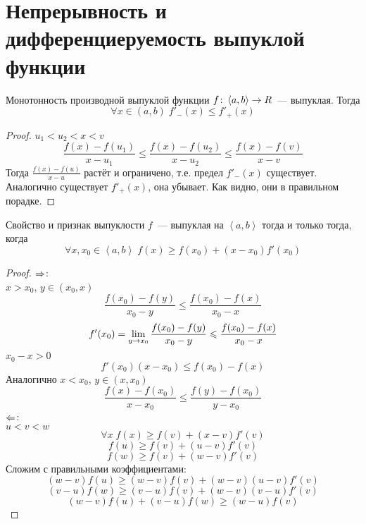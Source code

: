 ﻿\section{Непрерывность и дифференциеруемость выпуклой функции}

\begin{theorem}{Монотонность производной выпуклой функции}
$f\colon \left<a, b\right> \rightarrow R$~--- выпуклая. Тогда 
$$\forall x \in (a, b)\; f'_-(x) \leqslant f'_+(x)$$
\end{theorem}
\begin{proof}
$u_1 < u_2 < x < v$
$$\frac{f(x)-f(u_1)}{x-u_1} \leqslant \frac{f(x)-f(u_2)}{x-u_2} \leqslant \frac{f(x)-f(v)}{x-v}$$
Тогда $\frac{f(x)-f(u)}{x-u}$ растёт и ограничено, т.е. предел $f'_-(x)$ существует.
Аналогично существует $f'_+(x)$, она убывает. Как видно, они в правильном порадке.
\end{proof}

\begin{theorem}{Свойство и признак выпуклости}
$f$~--- выпуклая на $\left<a, b\right>$ тогда и только тогда, когда
$$\forall x, x_0 \in \left<a, b\right>\; f(x) \geqslant f(x_0) + (x-x_0)f'(x_0)$$
\end{theorem}
\begin{proof}
$\Rightarrow$:\\
$x > x_0$, $y \in (x_0, x)$
$$\frac{f(x_0) - f(y)}{x_0-y} \leqslant \frac{f(x_0)-f(x)}{x_0 - x}$$
$$f'(x_0) = \lim_{y \rightarrow x_0} \frac{f(x_0) - f(y)}{x_0-y} \leqslant \frac{f(x_0) - f(x)}{x_0 - x}$$
$x_0 - x > 0$
$$f'(x_0)(x-x_0) \leqslant f(x_0) - f(x)$$
Аналогично $x < x_0$, $y \in (x, x_0)$
$$\frac{f(x) - f(x_0)}{x-x_0} \leqslant \frac{f(y)-f(x_0)}{y - x_0}$$
$\Leftarrow$:\\
$u<v<w$
$$\forall x\; f(x) \geqslant f(v) + (x-v) f'(v)$$
$$f(u) \geqslant f(v) + (u-v) f'(v)$$
$$f(w) \geqslant f(v) + (w-v) f'(v)$$
Сложим с правильными коэффициентами:
$$(w-v)f(u) \geqslant (w-v) f(v) + (w-v)(u-v) f'(v)$$
$$(v-u)f(w) \geqslant (v-u) f(v) + (w-v)(v-u) f'(v)$$
$$(w-v)f(u) + (v-u) f(w) \geqslant (w-u) f(v)$$
\end{proof}
